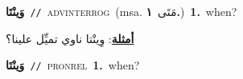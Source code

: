 \documentclass[10pt,a4paper,twoside]{article} %
\begin{document}
\begin{multicols}{2}
{\setlength\topsep{0pt}\textbf{\foreignlanguage{arabic}{وَينْتَا}}\ {\color{gray}\texttt{//}\color{black}}\ \textsc{adv\textunderscore interrog}\ \color{gray}(msa. \foreignlanguage{arabic}{مَتَى}~\foreignlanguage{arabic}{\textbf{١.}})\color{black}\ \textbf{1.}~when?\  \begin{flushright}\color{gray}\foreignlanguage{arabic}{\textbf{\underline{\foreignlanguage{arabic}{أمثلة}}}: وِينْتا ناوي تميِّل علينا؟}\end{flushright}\color{black}} \vspace{2mm}

{\setlength\topsep{0pt}\textbf{\foreignlanguage{arabic}{وَينْتَا}}\ {\color{gray}\texttt{//}\color{black}}\ \textsc{pron\textunderscore rel}\ \textbf{1.}~when?\ } \vspace{2mm}

\end{multicols}
\end{document}
